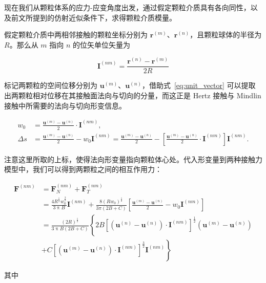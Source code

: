 现在我们从颗粒体系的应力-应变角度出发，通过假定颗粒介质具有各向同性，以及前文所提到的仿射近似条件下，求得颗粒介质模量\cite{WALTON1987213}。

假定颗粒介质中两相邻接触的颗粒坐标分别为 $\mathbf{r}^{(m)}$、$\mathbf{r}^{(n)}$，且颗粒球体的半径为 $R$。那么从 $m$ 指向 $n$ 的位矢单位矢量为

\begin{equation}
  \mathbf{I}^{(nm)} = \frac{\mathbf{r}^{(n)} - \mathbf{r}^{(m)}}{2R}\label{eq:unit_vector}
\end{equation}

标记两颗粒的空间位移分别为 $\mathbf{u}^{(m)}$、$\mathbf{u}^{(n)}$，借助式~\eqref{eq:unit_vector} 可以提取出两颗粒相对位移在其接触面法向与切向的分量，而这正是 Hertz 接触与 Mindlin 接触中所需要的法向与切向形变信息。

\begin{align}
  w_{0} &= \frac{\mathbf{u}^{(m)} - \mathbf{u}^{(n)}}{2}\cdot \mathbf{I}^{(nm)},\\
  \Delta s &= \frac{\mathbf{u}^{(m)} - \mathbf{u}^{(n)}}{2} - w_{0}\mathbf{I}^{(nm)} = \frac{\mathbf{u}^{(m)} - \mathbf{u}^{(n)}}{2} - \left[\frac{\mathbf{u}^{(m)} - \mathbf{u}^{(n)}}{2}\cdot \mathbf{I}^{(nm)}\right]\mathbf{I}^{(nm)}.
\end{align}

注意这里所取的上标，使得法向形变量指向颗粒体心处。代入形变量到两种接触力模型中，我们可以得到两颗粒之间的相互作用力：

\begin{equation}
  \begin{aligned}
  \mathbf{F}^{(nm)} &= \mathbf{F}_{N}^{(nm)} + \mathbf{F}_{T}^{(nm)}\\
  &= \frac{4R^{\frac{1}{2}}w_{0}^{\frac{3}{2}}}{3\uppi B}\mathbf{I}^{(nm)} + \frac{8(Rw_{0})^{\frac{1}{2}}}{3\pi(2B+C)}\left[\frac{\mathbf{u}^{(m)} - \mathbf{u}^{(n)}}{2} - w_{0}\mathbf{I}^{(nm)}\right]\\
  &= \frac{(2R)^{\frac{1}{2}}}{3\uppi B(2B+C)}\left\{2B\left[\left(\mathbf{u}^{(n)} - \mathbf{u}^{(n)}\right)\cdot \mathbf{I}^{(nm)}\right]^{\frac{1}{2}}\left(\mathbf{u}^{(m)} - \mathbf{u}^{(n)}\right)\right.\\
   &+ \left.C\left[\left(\mathbf{u}^{(m)} - \mathbf{u}^{(n)}\right)\cdot \mathbf{I}^{(nm)}\right]^{\frac{3}{2}}\mathbf{I}^{(nm)}\right\}
  \end{aligned}\label{eq:contact_force}
\end{equation}

其中

